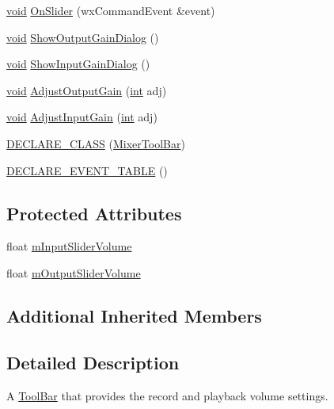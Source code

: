 \begin{DoxyCompactItemize}
\item 
\hyperlink{sound_8c_ae35f5844602719cf66324f4de2a658b3}{void} \hyperlink{class_mixer_tool_bar_a9720137ddb51fe944fed1697902d84cd}{On\+Slider} (wx\+Command\+Event \&event)
\item 
\hyperlink{sound_8c_ae35f5844602719cf66324f4de2a658b3}{void} \hyperlink{class_mixer_tool_bar_a821e96ed9c0484e3363b0889fff53160}{Show\+Output\+Gain\+Dialog} ()
\item 
\hyperlink{sound_8c_ae35f5844602719cf66324f4de2a658b3}{void} \hyperlink{class_mixer_tool_bar_add1cf480f358e4d42204f466d5b7d316}{Show\+Input\+Gain\+Dialog} ()
\item 
\hyperlink{sound_8c_ae35f5844602719cf66324f4de2a658b3}{void} \hyperlink{class_mixer_tool_bar_acc39dd8e89adc4dc7d0573c9b3552194}{Adjust\+Output\+Gain} (\hyperlink{xmltok_8h_a5a0d4a5641ce434f1d23533f2b2e6653}{int} adj)
\item 
\hyperlink{sound_8c_ae35f5844602719cf66324f4de2a658b3}{void} \hyperlink{class_mixer_tool_bar_a930449de4f20ac40292c6e7185a20839}{Adjust\+Input\+Gain} (\hyperlink{xmltok_8h_a5a0d4a5641ce434f1d23533f2b2e6653}{int} adj)
\item 
\hyperlink{class_mixer_tool_bar_a5c5e6a3a2b5301d3825271549fd4b4c4}{D\+E\+C\+L\+A\+R\+E\+\_\+\+C\+L\+A\+SS} (\hyperlink{class_mixer_tool_bar}{Mixer\+Tool\+Bar})
\item 
\hyperlink{class_mixer_tool_bar_afcb894daffadd7c4c8a1399c8885b8ce}{D\+E\+C\+L\+A\+R\+E\+\_\+\+E\+V\+E\+N\+T\+\_\+\+T\+A\+B\+LE} ()
\end{DoxyCompactItemize}
\subsection*{Protected Attributes}
\begin{DoxyCompactItemize}
\item 
float \hyperlink{class_mixer_tool_bar_a592e6d5ac1591aac02c0e4dded3c2712}{m\+Input\+Slider\+Volume}
\item 
float \hyperlink{class_mixer_tool_bar_a0fb076bd1b2c5a267723fb949c222713}{m\+Output\+Slider\+Volume}
\end{DoxyCompactItemize}
\subsection*{Additional Inherited Members}


\subsection{Detailed Description}
A \hyperlink{class_tool_bar}{Tool\+Bar} that provides the record and playback volume settings. 

